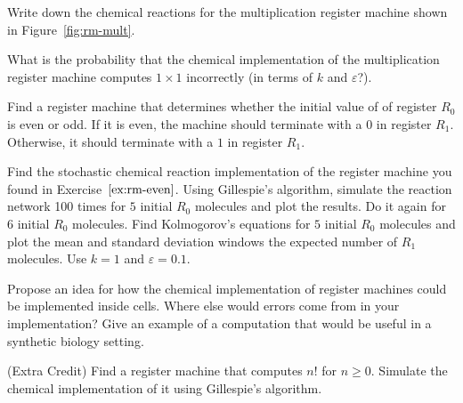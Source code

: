 \begin{exercise}
  Write down the chemical reactions for the multiplication register
  machine shown in Figure~\ref{fig:rm-mult}. 
\end{exercise}

\begin{exercise}
  What is the probability that the chemical implementation of the
  multiplication register machine computes $1 \times 1$ incorrectly
  (in terms of $k$ and $\varepsilon$?). 
\end{exercise}

\begin{exercise} \label{ex:rm-even}
  Find a register machine that determines whether the initial value of
  of register $R_0$ is even or odd. If it is even, the machine should
  terminate with a $0$ in register $R_1$. Otherwise, it should
  terminate with a $1$ in register $R_1$. 
\end{exercise}

\begin{exercise}
  Find the stochastic chemical reaction implementation of the register
  machine you found in Exercise~$\ref{ex:rm-even}$. Using Gillespie's
  algorithm, simulate the reaction network 100 times for $5$ initial
  $R_0$ molecules and plot the results. Do it again for $6$ initial
  $R_0$ molecules. Find Kolmogorov's equations for $5$ initial $R_0$
  molecules and plot the mean and standard deviation windows the
  expected number of $R_1$ molecules. Use $k=1$ and $\varepsilon=0.1$.
\end{exercise}

\begin{exercise}
  Propose an idea for how the chemical implementation of register
  machines could be implemented inside cells. Where else would errors
  come from in your implementation? Give an example of a computation
  that would be useful in a synthetic biology setting.
\end{exercise}

\begin{exercise}
  (Extra Credit) Find a register machine that computes $n!$ for $n
  \geq 0$. Simulate the chemical implementation of it using
  Gillespie's algorithm. 
\end{exercise}

